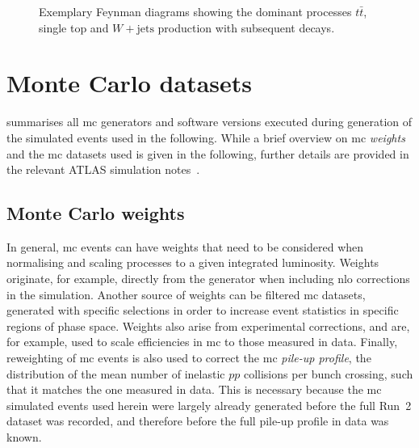 \begin{figure}
\begin{subfigure}[b]{0.3\linewidth}
		\caption{\label{fig:wjets}}
	\end{subfigure}
	\caption{Exemplary Feynman diagrams showing the dominant processes  $t\bar{t}$,  single top and  $W+\textrm{jets}$ production with subsequent decays.}
	\label{fig:sm_backgrounds_feynman}
\end{figure}


\section{Monte Carlo datasets}

 summarises all \gls{mc} generators and software versions executed during generation of the simulated events used in the following. While a brief overview on \gls{mc} \textit{weights} and the \gls{mc} datasets used is given in the following, further details are provided in the relevant ATLAS simulation notes~\cite{ATL-PHYS-PUB-2018-009,ATL-PHYS-PUB-2016-005,ATL-PHYS-PUB-2017-006,ATL-PHYS-PUB-2017-005}.

\subsection{Monte Carlo weights}\label{sec:mc_weights}

In general, \gls{mc} events can have weights that need to be considered when normalising and scaling processes to a given integrated luminosity.
Weights originate, for example, directly from the generator when including \gls{nlo} corrections in the simulation.
Another source of weights can be filtered \gls{mc} datasets, generated with specific selections in order to increase event statistics in specific regions of phase space.
Weights also arise from experimental corrections, and are, for example, used to scale efficiencies in \gls{mc} to those measured in data. Finally, reweighting of \gls{mc} events is also used to correct the \gls{mc} \textit{pile-up profile}, \ie the distribution of the mean number of inelastic $pp$ collisions per bunch crossing, such that it matches the one measured in data.
This is necessary because the \gls{mc} simulated events used herein were largely already generated before the full Run~2 dataset was recorded, and therefore before the full pile-up profile in data was known.

